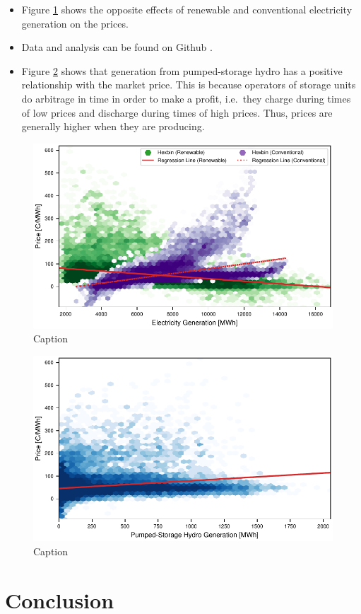 \documentclass{article}
\begin{document}
\begin{itemize}
    \item Figure \ref{fig:ren_vs_con_regression} shows the opposite effects of renewable and conventional electricity generation on the prices.
    \item Data and analysis can be found on Github \citep{github_repo}.
    \item Figure \ref{fig:pumped_hydro_regression} shows that generation from pumped-storage hydro has a positive relationship with the market price.
    This is because operators of storage units do arbitrage in time in order to make a profit, i.e.\ they charge during times of low prices and discharge during times of high prices.
    Thus, prices are generally higher when they are producing.
\end{itemize}

\begin{figure}
    \centering
    \includegraphics[width=0.7\columnwidth]{doc/fig/ren_vs_con_regression.pdf}
    \caption{Caption}
    \label{fig:ren_vs_con_regression}
\end{figure}


\begin{figure}
    \centering
    \includegraphics[width=0.7\columnwidth]{doc/fig/pumped_hydro_regression.pdf}
    \caption{Caption}
    \label{fig:pumped_hydro_regression}
\end{figure}

\section{Conclusion}



\end{document}
